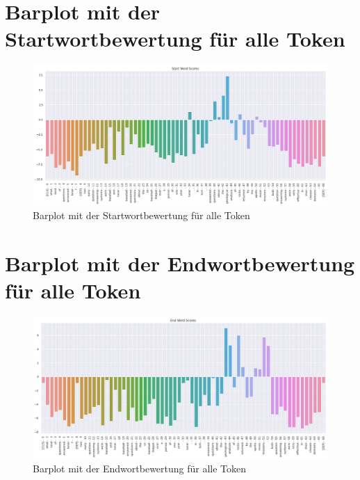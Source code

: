 \documentclass[
        ngerman,
        paper=a4,
        numbers=noendperiod,
]{scrreprt}
\begin{document}
\section{Barplot mit der Startwortbewertung für alle Token}
\label{section:TOKS}
\begin{figure}[H]
    \centering\includegraphics[width=1\linewidth]{images/start.png}
    \caption[Barplot mit der Startwortbewertung für alle Token]{Barplot mit der Startwortbewertung für alle Token}
    \label{fig:start}
\end{figure}

\section{Barplot mit der Endwortbewertung für alle Token}
\label{section:TOKE}
\begin{figure}[H]
    \centering\includegraphics[width=1\linewidth]{images/end.png}
    \caption[Barplot mit der Endwortbewertung für alle Token]{Barplot mit der Endwortbewertung für alle Token}
    \label{fig:end}
\end{figure}







\clearpage
        
\end{document}
